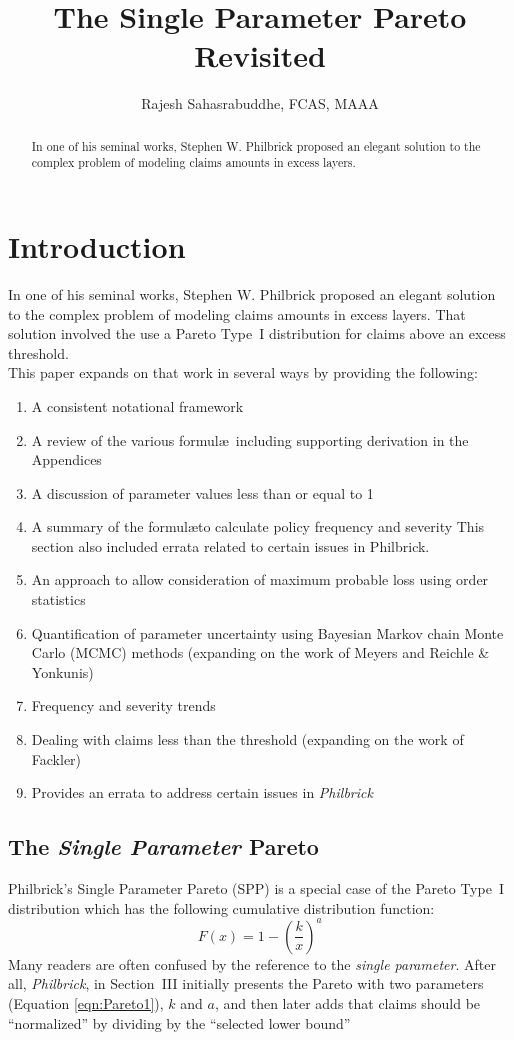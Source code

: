 \documentclass[]{article} %
\title{The Single Parameter Pareto Revisited}
\author{Rajesh Sahasrabuddhe, FCAS, MAAA}
\newcommand{\philbrick}{\textit{Philbrick}}
\begin{document}
\maketitle

\begin{abstract}
In one of his seminal works, Stephen W. Philbrick proposed an elegant solution to the complex problem of modeling claims amounts in excess layers. 

\end{abstract}

\section{Introduction}
In one of his seminal works, Stephen W. Philbrick\cite{Philbrick} proposed an elegant solution to the complex problem of modeling claims amounts in excess layers. That solution involved the use a Pareto Type~I distribution for claims above an excess threshold.\\

This paper expands on that work in several ways by providing the following:
\begin{enumerate}
	\item A consistent notational framework
	\item A review of the various formul\ae~including supporting derivation in the Appendices
	\item A discussion of parameter values less than or equal to 1
	\item A summary of the formul\ae to calculate policy frequency and severity This section also included  errata related to certain issues in Philbrick.
	\item An approach to allow consideration of maximum probable loss using order statistics
	\item Quantification of parameter uncertainty using Bayesian Markov chain Monte Carlo (MCMC) methods (expanding on the work of Meyers and Reichle \& Yonkunis)
	\item Frequency and severity trends
	\item Dealing with claims less than the threshold (expanding on the work of Fackler)
	\item Provides an errata to address certain issues in \philbrick
\end{enumerate}

\subsection{The \emph{Single Parameter} Pareto}\label{sec:theSPP}
Philbrick's Single Parameter Pareto (SPP) is a special case of the Pareto Type~I distribution which has the following cumulative distribution function:
\begin{equation}
F(x) = 1 - \left(\frac{k}{x} \right)^a\label{eqn:Pareto1}
\end{equation}
Many readers are often confused by the reference to the \emph{single parameter}. After all, \philbrick, in Section~III initially presents the Pareto with two parameters (Equation \ref{eqn:Pareto1}), $k$ and $a$, and then later adds that claims should be ``normalized'' by dividing by the ``selected lower bound''
\end{document}
